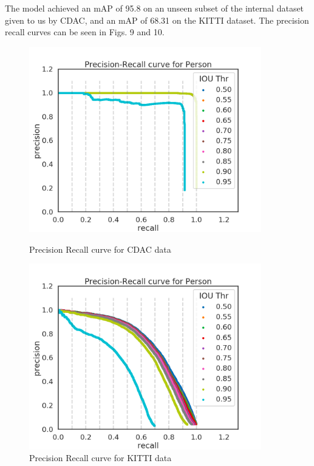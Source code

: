 \documentclass[12pt,letterpaper]{article}
\begin{document}
The model achieved an mAP of 95.8 on an unseen subset of the internal dataset given to us by CDAC, and an mAP of 68.31 on the KITTI dataset. The precision recall curves can be seen in Figs. 9 and 10.

\begin{figure}
    \centering

    \begin{minipage}{0.45\textwidth}
        \centering
        \includegraphics[width=0.9\textwidth]{assets/SSD_MAP_CDAC.png}
        \caption{Precision Recall curve for CDAC data}
    \end{minipage} \hfill
    \begin{minipage}{0.45\textwidth}
        \centering
        \includegraphics[width=0.9\textwidth]{assets/SSD_MAP_KITTI.png}
        \caption{Precision Recall curve for KITTI data}
    \end{minipage}

\end{figure}
\end{document}
